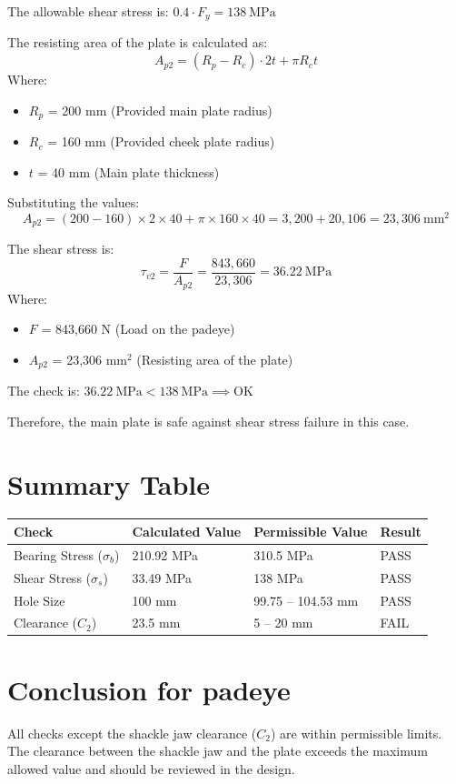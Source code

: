 \documentclass[12pt]{article}
\begin{document}
The allowable shear stress is:
\(
0.4 \cdot F_{y} = 138\ \mathrm{MPa}
\)

The resisting area of the plate is calculated as:
\[
A_{p2} = (R_p - R_c) \cdot 2t + \pi R_c t
\]
Where:
\begin{itemize}
  \item $R_p$ = 200 mm (Provided main plate radius)
  \item $R_c$ = 160 mm (Provided cheek plate radius)
  \item $t$ = 40 mm (Main plate thickness)
\end{itemize}

Substituting the values:
\[
A_{p2} = (200 - 160) \times 2 \times 40 + \pi \times 160 \times 40 = 3,200 + 20,106 = 23,306\ \mathrm{mm}^2
\]

The shear stress is:
\[
\tau_{v2} = \frac{F}{A_{p2}} = \frac{843,660}{23,306} = 36.22\ \mathrm{MPa}
\]
Where:
\begin{itemize}
  \item $F$ = 843,660 N (Load on the padeye)
  \item $A_{p2}$ = 23,306 mm$^2$ (Resisting area of the plate)
\end{itemize}

The check is:
\(
36.22\ \mathrm{MPa} < 138\ \mathrm{MPa} \implies \text{OK}
\)

Therefore, the main plate is safe against shear stress failure in this case.

\section{Summary Table}
\begin{center}
\begin{tabular}{|l|l|l|l|}
\hline
Check & Calculated Value & Permissible Value & Result \\
\hline
Bearing Stress ($\sigma_b$) & 210.92 MPa & 310.5 MPa & PASS \\
Shear Stress ($\sigma_s$) & 33.49 MPa & 138 MPa & PASS \\
Hole Size & 100 mm & 99.75 -- 104.53 mm & PASS \\
Clearance ($C_2$) & 23.5 mm & 5 -- 20 mm & FAIL \\
\hline
\end{tabular}
\end{center}

\section{Conclusion for padeye}
All checks except the shackle jaw clearance ($C_2$) are within permissible limits. The clearance between the shackle jaw and the plate exceeds the maximum allowed value and should be reviewed in the design.
\end{document}
